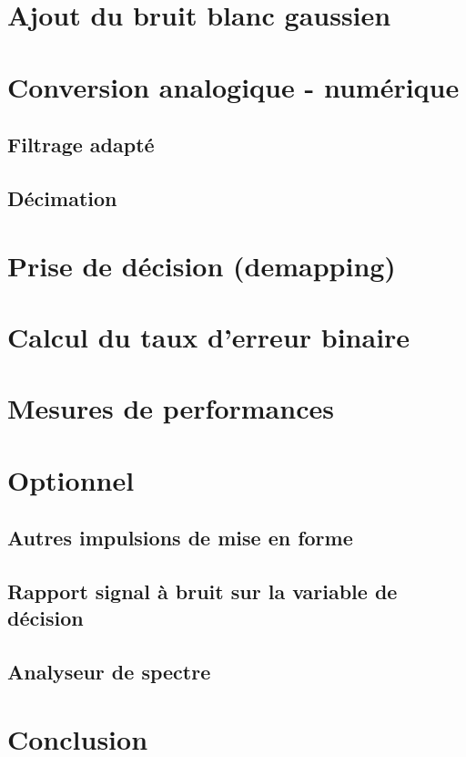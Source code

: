 \documentclass{acm_proc_article-sp}
\begin{document}
\section{Ajout du bruit blanc gaussien}


\section{Conversion analogique - numérique}
\subsection{Filtrage adapté}
\subsection{Décimation}


\section{Prise de décision (demapping)}


\section{Calcul du taux d'erreur binaire}


\section{Mesures de performances}


\section{Optionnel}
\subsection{Autres impulsions de mise en forme}
\subsection{Rapport signal à bruit sur la variable de décision}
\subsection{Analyseur de spectre}


\section{Conclusion}


\nocite{*}

\balancecolumns
\end{document}
